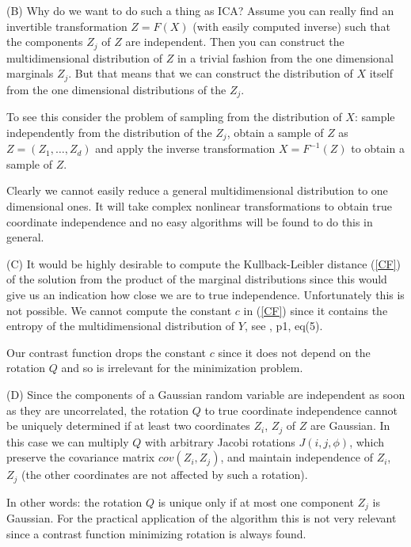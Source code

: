 \documentclass[
10pt,
fleqn,
nosumlimits,
nointlimits,
nonamelimits
]
{article}
\begin{document}
\medskip\noindent
(B) Why do we want to do such a thing as ICA? Assume you can really find an invertible transformation 
$Z=F(X)$ (with easily computed inverse) such that the components $Z_j$ of $Z$ are independent.
Then you can construct the multidimensional distribution of $Z$ in a trivial fashion from the one dimensional
marginals $Z_j$. But that means that we can construct the distribution of $X$ itself from the one dimensional
distributions of the $Z_j$.

To see this consider the problem of sampling from the distribution of $X$: sample independently from the
distribution of the $Z_j$, obtain a sample of $Z$ as $Z=(Z_1,\dots,Z_d)$ and apply the inverse transformation
$X=F^{-1}(Z)$ to obtain a sample of $Z$. 

Clearly we cannot easily reduce a general multidimensional distribution to one dimensional ones.
It will take complex nonlinear transformations to obtain true coordinate independence and no easy algorithms 
will be found to do this in general.


\medskip\noindent
(C) It would be highly desirable to compute the Kullback-Leibler distance (\ref{CF}) of the solution
from the product of the marginal distributions since this would give us an indication how close we are
to true independence. Unfortunately this is not possible. We cannot compute the constant $c$ in 
(\ref{CF}) since it contains the entropy of the multidimensional distribution of $Y$, see \cite{MilFish},
p1, eq(5). 

Our contrast function drops the constant $c$ since it does not depend on the rotation $Q$ and so is
irrelevant for the minimization problem.


\medskip\noindent
(D) Since the components of a Gaussian random variable are independent as soon as they are uncorrelated, the rotation
$Q$ to true coordinate independence cannot be uniquely determined if at least two coordinates $Z_i$, $Z_j$ of $Z$  
are Gaussian. In this case we can multiply $Q$ with arbitrary Jacobi rotations $J(i,j,\phi)$, which preserve
the covariance matrix $cov(Z_i,Z_j)$, and maintain independence of $Z_i$, $Z_j$ (the other coordinates are not affected
by such a rotation).

In other words: the rotation $Q$ is unique only if at most one component $Z_j$ is Gaussian. For the practical
application of the algorithm this is not very relevant since a contrast function minimizing rotation is always found.
\end{document}
